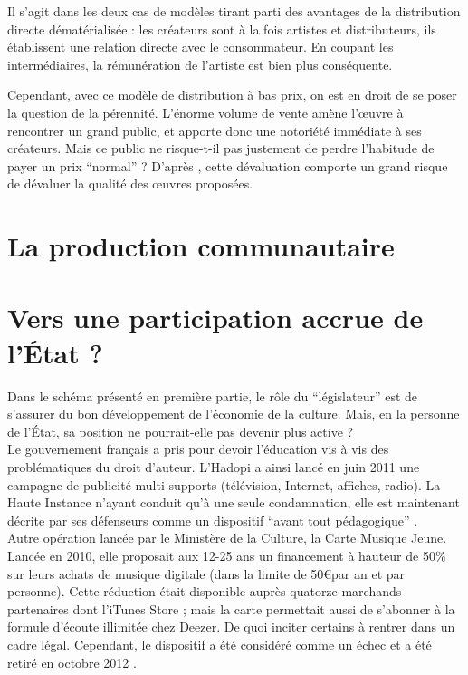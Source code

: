 \documentclass[a4paper]{report}
\begin{document}
	Il s'agit dans les deux cas de modèles tirant parti des avantages de la distribution directe dématérialisée : les créateurs sont à la fois artistes et distributeurs, ils établissent une relation directe avec le consommateur. En coupant les intermédiaires, la rémunération de l'artiste est bien plus conséquente.

	Cependant, avec ce modèle de distribution à bas prix, on est en droit de se poser la question de la pérennité. L'énorme volume de vente amène l’œuvre à rencontrer un grand public, et apporte donc une notoriété immédiate à ses créateurs. Mais ce public ne risque-t-il pas justement de perdre l'habitude de payer un prix ``normal'' ? D'après \cite{low-prices-low-expectations}, cette dévaluation comporte un grand risque de dévaluer la qualité des œuvres proposées.

	\section{La production communautaire}
	


	\section{Vers une participation accrue de l'État ?}
	Dans le schéma présenté en première partie, le rôle du ``législateur'' est de s'assurer du bon développement de l'économie de la culture. Mais, en la personne de l'État, sa position ne pourrait-elle pas devenir plus active ?\\

	Le gouvernement français a pris pour devoir l'éducation vis à vis des problématiques du droit d'auteur. L'Hadopi a ainsi lancé en juin 2011 une campagne de publicité multi-supports (télévision, Internet, affiches, radio). La Haute Instance n'ayant conduit qu'à une seule condamnation, elle est maintenant décrite par ses défenseurs comme un dispositif ``avant tout pédagogique'' \cite{podcast-industrie-musicale}.\\

	Autre opération lancée par le Ministère de la Culture, la Carte Musique Jeune. Lancée en 2010, elle proposait aux 12-25 ans un financement à hauteur de 50\% sur leurs achats de musique digitale (dans la limite de 50\euro par an et par personne). Cette réduction était disponible auprès quatorze marchands partenaires dont l'iTunes Store ; mais la carte permettait aussi de s'abonner à la formule d'écoute illimitée chez Deezer. De quoi inciter certains à rentrer dans un cadre légal. Cependant, le dispositif a été considéré comme un échec \cite{carte-musique-jeune-echec} et a été retiré en octobre 2012 \cite{carte-musique-jeune-arret}.\\
\end{document}
